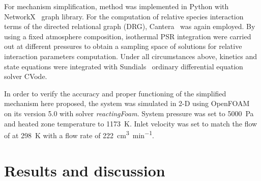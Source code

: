 \documentclass[final,3p,times,twocolumn,sort&compress]{elsarticle}
\begin{document}
For mechanism simplification, \citet{Lu2005} method was implemented in Python with NetworkX~\cite{Networkx2016} graph library. For the computation of relative species interaction terms of the directed relational graph (DRG), Cantera~\cite{Cantera2014} was again employed. By using a fixed atmosphere composition, isothermal PSR integration were carried out at different pressures to obtain a sampling space of solutions for relative interaction parameters computation. Under all circumstances above, kinetics and state equations were integrated with Sundials~\cite{Hindmarsh2005} ordinary differential equation solver CVode.

In order to verify the accuracy and proper functioning of the simplified mechanism here proposed, the system was simulated in 2-D using OpenFOAM~\cite{Weller1998} on its version 5.0 with solver \emph{reactingFoam}. System pressure was set to \SI{5000}{\pascal} and heated zone temperature to \SI{1173}{\kelvin}. Inlet velocity was set to match the flow of  at \SI{298}{\kelvin} with a flow rate of \SI{222}{\cubic\centi\metre\per\minute}.

\section{Results and discussion}
\end{document}
